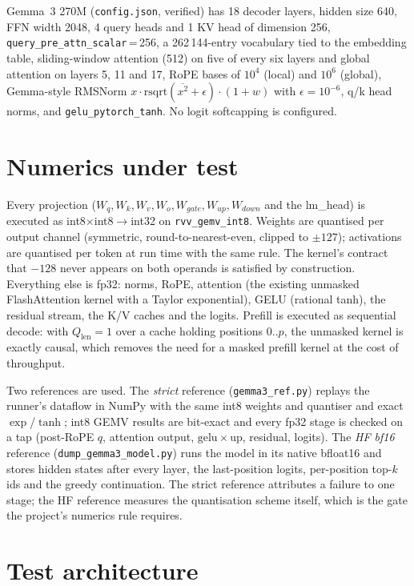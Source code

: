\documentclass[10pt,twocolumn]{article}
\begin{document}
Gemma~3 270M (\texttt{config.json}, verified) has 18 decoder layers, hidden
size 640, FFN width 2048, 4 query heads and 1 KV head of dimension 256,
\texttt{query\_pre\_attn\_scalar}\,=\,256, a 262\,144-entry vocabulary tied to
the embedding table, sliding-window attention (512) on five of every six layers
and global attention on layers 5, 11 and 17, RoPE bases of $10^4$ (local) and
$10^6$ (global), Gemma-style RMSNorm $x\cdot\mathrm{rsqrt}(\overline{x^2}+\epsilon)\cdot(1+w)$
with $\epsilon=10^{-6}$, q/k head norms, and \texttt{gelu\_pytorch\_tanh}. No
logit softcapping is configured.

\section{Numerics under test}
Every projection ($W_q,W_k,W_v,W_o,W_{gate},W_{up},W_{down}$ and the lm\_head)
is executed as int8$\times$int8$\to$int32 on \texttt{rvv\_gemv\_int8}. Weights
are quantised per output channel (symmetric, round-to-nearest-even, clipped to
$\pm127$); activations are quantised per token at run time with the same rule.
The kernel's contract that $-128$ never appears on both operands is satisfied by
construction. Everything else is fp32: norms, RoPE, attention (the existing
unmasked FlashAttention kernel with a Taylor exponential), GELU (rational tanh),
the residual stream, the K/V caches and the logits. Prefill is executed as
sequential decode: with $Q_{\text{len}}=1$ over a cache holding positions
$0..p$, the unmasked kernel is exactly causal, which removes the need for a
masked prefill kernel at the cost of throughput.

Two references are used. The \emph{strict} reference (\texttt{gemma3\_ref.py})
replays the runner's dataflow in NumPy with the same int8 weights and
quantiser and exact $\exp$/$\tanh$; int8 GEMV results are bit-exact and every
fp32 stage is checked on a tap (post-RoPE $q$, attention output,
$\mathrm{gelu}\times\mathrm{up}$, residual, logits). The \emph{HF bf16}
reference (\texttt{dump\_gemma3\_model.py}) runs the model in its native
bfloat16 and stores hidden states after every layer, the last-position logits,
per-position top-$k$ ids and the greedy continuation. The strict reference
attributes a failure to one stage; the HF reference measures the quantisation
scheme itself, which is the gate the project's numerics rule requires.

\section{Test architecture}
\end{document}

